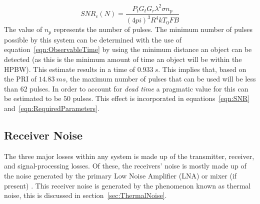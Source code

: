 \documentclass[11pt]{witseiepaper}
\begin{document}
\begin{bibunit}[witseie]
\begin{equation} \label{eqn:MultiplePulses}
SNR_c (N) = \frac{P_{t} G_{t} G_{r} \lambda^2 \sigma n_p}{(4 pi)^3 R^4 k T_0 F B}  
\end{equation}
The value of $n_p$ represents the number of pulses. The minimum number of pulses possible by this system can be determined with the use of equation~\ref{eqn:ObservableTime} by using the minimum distance an object can be detected (as this is the minimum amount of time an object will be within the HPBW). This estimate results in a time of $0.933~s$. This implies that, based on the PRI of $14.83~ms$, the maximum number of pulses that can be used will be less than $62$ pulses.
In order to account for \textit{dead time} a pragmatic value for this can be estimated to be $50$ pulses. This effect is incorporated in equations~\ref{eqn:SNR} and~\ref{eqn:RequiredParameters}.

\subsection{Receiver Noise} \label{sec:ReceiverNoise}
The three major losses within any system is made up of the transmitter, receiver, and signal-processing losses.
Of these, the receivers' noise is mostly made up of the noise generated by the primary Low Noise Amplifier (LNA) or mixer (if present) \cite[p.~405]{radarHandbook}.
This receiver noise is generated by the phenomenon known as thermal noise, this is discussed in section~\ref{sec:ThermalNoise}.


\end{bibunit}
\end{document}
